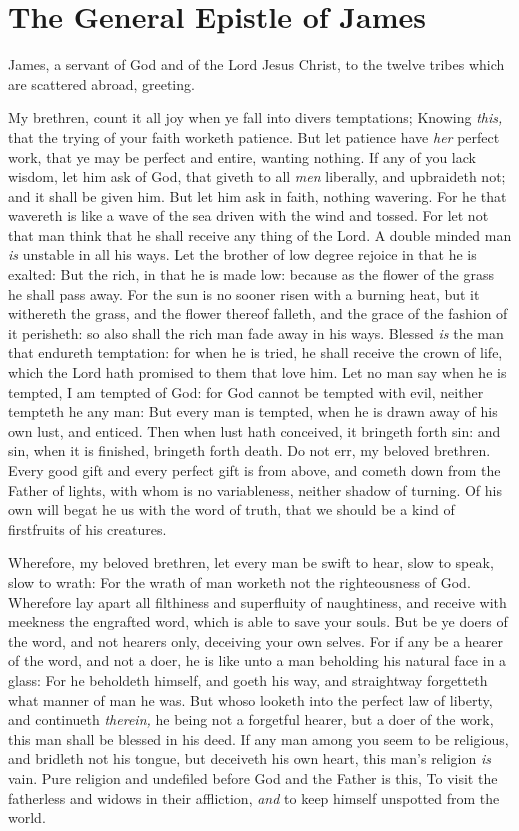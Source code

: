 \documentclass[11pt,letterpaper,oneside]{memoir}
\begin{document}
\chapter[James]{The General Epistle of James}

James, a servant of God and of the Lord Jesus Christ, to the twelve 
tribes which are scattered abroad, greeting. 

My brethren, count it all joy when ye fall into divers temptations; 
Knowing \emph{this,} that the trying of your faith worketh patience. But let 
patience have \emph{her} perfect work, that ye may be perfect and entire, 
wanting nothing. If any of you lack wisdom, let him ask of God, that 
giveth to all \emph{men} liberally, and upbraideth not; and it shall be given 
him. But let him ask in faith, nothing wavering. For he that wavereth is 
like a wave of the sea driven with the wind and tossed. For let not that 
man think that he shall receive any thing of the Lord. A double minded 
man \emph{is} unstable in all his ways. Let the brother of low degree rejoice 
in that he is exalted: But the rich, in that he is made low: because as 
the flower of the grass he shall pass away. For the sun is no sooner 
risen with a burning heat, but it withereth the grass, and the flower 
thereof falleth, and the grace of the fashion of it perisheth: so also 
shall the rich man fade away in his ways. Blessed \emph{is} the man that 
endureth temptation: for when he is tried, he shall receive the crown of 
life, which the Lord hath promised to them that love him. Let no man say 
when he is tempted, I am tempted of God: for God cannot be tempted with 
evil, neither tempteth he any man: But every man is tempted, when he is 
drawn away of his own lust, and enticed. Then when lust hath conceived, 
it bringeth forth sin: and sin, when it is finished, bringeth forth 
death. Do not err, my beloved brethren. Every good gift and every 
perfect gift is from above, and cometh down from the Father of lights, 
with whom is no variableness, neither shadow of turning. Of his own will 
begat he us with the word of truth, that we should be a kind of 
firstfruits of his creatures. 

Wherefore, my beloved brethren, let every man be swift to hear, slow to 
speak, slow to wrath: For the wrath of man worketh not the righteousness 
of God. Wherefore lay apart all filthiness and superfluity of 
naughtiness, and receive with meekness the engrafted word, which is able 
to save your souls. But be ye doers of the word, and not hearers only, 
deceiving your own selves. For if any be a hearer of the word, and not a 
doer, he is like unto a man beholding his natural face in a glass: For 
he beholdeth himself, and goeth his way, and straightway forgetteth what 
manner of man he was. But whoso looketh into the perfect law of liberty, 
and continueth \emph{therein,} he being not a forgetful hearer, but a doer of 
the work, this man shall be blessed in his deed. If any man among you 
seem to be religious, and bridleth not his tongue, but deceiveth his own 
heart, this man's religion \emph{is} vain. Pure religion and undefiled before 
God and the Father is this, To visit the fatherless and widows in their 
affliction, \emph{and} to keep himself unspotted from the world. 
\end{document}
